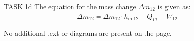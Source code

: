 TASK 1d  
The equation for the mass change \( \Delta m_{12} \) is given as:  
\[
\Delta m_{12} = \Delta m_{12} \cdot h_{\text{in,12}} + \dot{Q}_{12} - \dot{W}_{12}
\]  

No additional text or diagrams are present on the page.